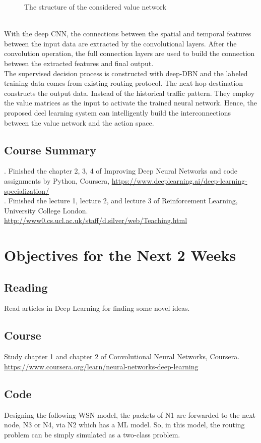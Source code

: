 \documentclass[11pt]{report}
\begin{document}
\begin{itemize}
\begin{figure}[h!]
	    	\caption{The structure of the considered value network}
	    	\label{2ndfig}
	    \end{figure}\\
    	With the deep CNN, the connections between the spatial and temporal features between the input data are extracted by the convolutional layers. After the convolution operation, the full connection layers are used to build the connection between the extracted features and final output.\\
    	The supervised decision process is constructed with deep-DBN and the labeled training data comes from existing routing protocol. The next hop destination constructs the output data. Instead of the historical traffic pattern. They employ the value matrices as the input to activate the trained neural network. Hence, the proposed deel learning system can intelligently build the interconnections between the value network and the action space. 
	\end{itemize}
	
	
	
	\subsection{Course Summary}
	. Finished the chapter 2, 3, 4 of Improving Deep Neural Networks and code assignments by Python, Coursera, \url{https://www.deeplearning.ai/deep-learning-specialization/ }\\
	
	. Finished the lecture 1, lecture 2, and lecture 3 of Reinforcement Learning, University College London. \url{http://www0.cs.ucl.ac.uk/staff/d.silver/web/Teaching.html}\\

	
	\section{Objectives for the Next 2 Weeks}
	\subsection{Reading} 
	Read articles in Deep Learning for finding some novel ideas.
	\subsection{Course} 
	Study chapter 1 and chapter 2 of Convolutional Neural Networks, Coursera. \url{https://www.coursera.org/learn/neural-networks-deep-learning}
	\subsection{Code}
	Designing the following WSN model, the packets of N1 are forwarded to the next node, N3 or N4, via N2 which has a ML model. So, in this model, the routing problem can be simply simulated as a two-class problem.\\
	
\end{document}
